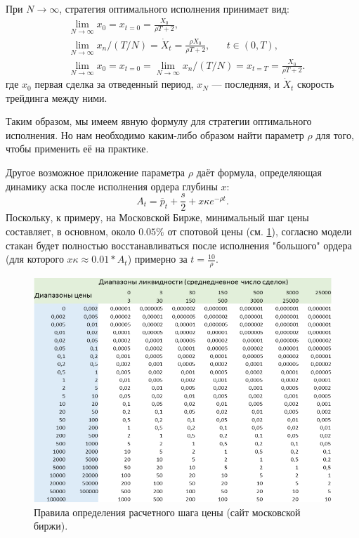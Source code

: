 \begin{theorem} \label{OEmainformula}
    При $N \rightarrow \infty$, стратегия оптимального исполнения принимает вид:
    \begin{align*}
        & \lim _{N \rightarrow \infty} x_0 = x_{t = 0} = \frac{X_0}{\rho T + 2}, \\
        & \lim _{N \rightarrow \infty} x_n / (T/N) = \dot X _t = \frac{\rho X_0}{\rho T + 2}, \;\;\;\;\;\; t \in (0, T), \\
        & \lim _{N \rightarrow \infty} x_0 = x_{t = 0} = \lim _{N \rightarrow \infty} x_n / (T/N) = x_{t=T}=  \frac{X_0}{\rho T + 2}.  %
    \end{align*}
    где $x_0$ первая сделка за отведенный период, $x_N$ --- последняя, и $\dot X _t$ скорость трейдинга между ними.
\end{theorem}


Таким образом, мы имеем явную формулу для стратегии оптимального исполнения. Но нам необходимо каким-либо образом найти
параметр $\rho$ для того, чтобы применить её на практике. \par

Другое возможное приложение параметра $\rho$ даёт формула, определяющая динамику аска после исполнения ордера глубины $x$:
\begin{equation*}
        A_t = \overline p _t + \frac{s}{2} + x \kappa e^{- \rho t}.
\end{equation*}
Поскольку, к примеру, на Московской Бирже, минимальный шаг цены составляет, в основном, около $0.05\%$ 
от спотовой цены (см. \ref{price_step}), согласно модели стакан будет полностью восстанавливаться 
после исполнения "большого" ордера (для которого $x \kappa \approx 0.01 * A_t $) примерно за $t = \frac{10}{\rho}$.
\begin{figure}
    \includegraphics[scale=0.64]{fig/price_step.png}
    \caption{Правила определения расчетного шага цены (сайт московской биржи).}
    \label{price_step}
\end{figure}

